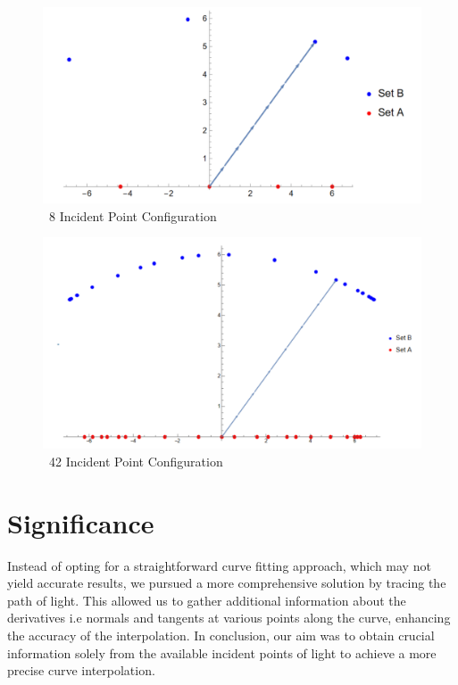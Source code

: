 \documentclass[12pt,a4paper,twoside]{report}
\begin{document}
\begin{figure}[h]
	\centering
	\includegraphics[width=1\textwidth]{pic1.png}
	\caption{~8 Incident Point Configuration}
\end{figure}
\begin{figure}[h]
	\centering
	\includegraphics[width=1\textwidth]{pic2.png}

\caption{~42 Incident Point Configuration}
\end{figure}

\section{Significance}
Instead of opting for a straightforward curve fitting approach, which may not yield accurate results, we pursued a more comprehensive solution by tracing the path of light. This allowed us to gather additional information about the derivatives i.e normals and tangents at various points along the curve, enhancing the accuracy of the interpolation. In conclusion, our aim was to obtain crucial information solely from the available incident points of light to achieve a more precise curve interpolation.
\end{document}
